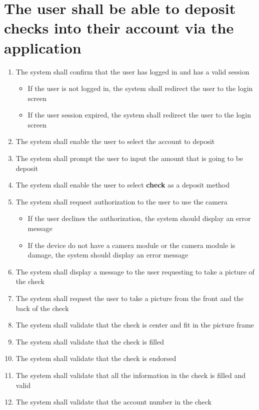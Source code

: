 \section{The user shall be able to deposit checks into their account via 
the application}
\begin{enumerate}
    \item The system shall confirm that the user has logged in and has a valid 
    session
    \begin{itemize}
        \item If the user is not logged in, the system shall redirect the user 
        to the login screen
	    \item If the user session expired, the system shall redirect the user 
        to the login screen
    \end{itemize}
    \item The system shall enable the user to select the account to deposit
    \item The system shall prompt the user to input the amount that is going to 
    be deposit
    \item The system shall enable the user to select \textbf{check} as a 
    deposit method
    \item The system shall request authorization to the user to use the camera
    \begin{itemize}
        \item If the user declines the authorization, the system should display 
        an error message 
        \item If the device do not have a camera module or the camera module is 
        damage, the system should display an error message
    \end{itemize}
    \item  The system shall display a message to the user requesting to take a 
    picture of the check
    \item The system shall request the user to take a picture from the front  
    and the back of the check
    \item The system shall validate that the check is center and fit in the 
    picture frame
    \item The system shall validate that the check is filled
    \item The system shall validate that the check is endorsed
    \item The system shall validate that all the information in the check is 
    filled and valid
    \pagebreak
    \item The system shall validate that the account number in the check 

\end{enumerate}
